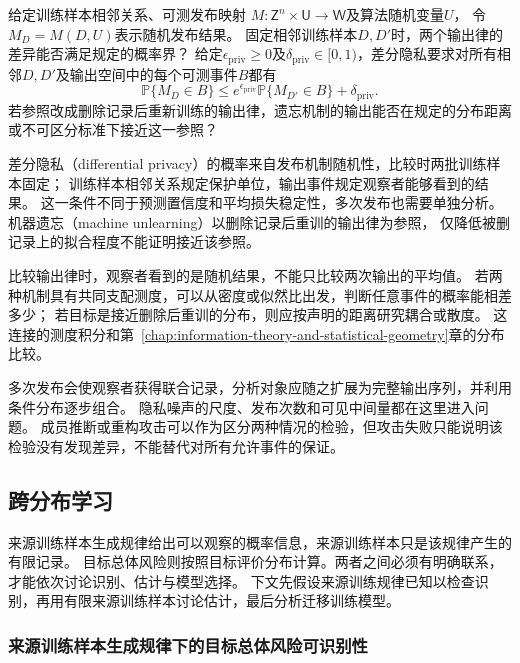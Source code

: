 \begin{mathproblem}[随机输出律的可区分程度]
  \label{question:future-output-law}
  给定训练样本相邻关系、可测发布映射
  $M:\mathsf Z^n\times\mathsf U\to\mathsf W$及算法随机变量$U$，
  令$M_D=M(D,U)$表示随机发布结果。
  固定相邻训练样本$D,D'$时，两个输出律的差异能否满足规定的概率界？
  给定$\epsilon_{\mathrm{priv}}\geq0$及$\delta_{\mathrm{priv}}\in[0,1)$，差分隐私要求对所有相邻$D,D'$及输出空间中的每个可测事件$B$都有
  \[
    \mathbb P\{M_D\in B\}
    \leq e^{\epsilon_{\mathrm{priv}}}
       \mathbb P\{M_{D'}\in B\}+\delta_{\mathrm{priv}}.
  \]
  若参照改成删除记录后重新训练的输出律，遗忘机制的输出能否在规定的分布距离
  或不可区分标准下接近这一参照？
\end{mathproblem}

差分隐私（differential privacy）的概率来自发布机制随机性，比较时两批训练样本固定；
训练样本相邻关系规定保护单位，输出事件规定观察者能够看到的结果。
这一条件不同于预测置信度和平均损失稳定性，多次发布也需要单独分析。
机器遗忘（machine unlearning）以删除记录后重训的输出律为参照，
仅降低被删记录上的拟合程度不能证明接近该参照。

比较输出律时，观察者看到的是随机结果，不能只比较两次输出的平均值。
若两种机制具有共同支配测度，可以从密度或似然比出发，判断任意事件的概率能相差多少；
若目标是接近删除后重训的分布，则应按声明的距离研究耦合或散度。
这连接的测度积分和第~\ref{chap:information-theory-and-statistical-geometry}章的分布比较。

多次发布会使观察者获得联合记录，分析对象应随之扩展为完整输出序列，并利用条件分布逐步组合。
隐私噪声的尺度、发布次数和可见中间量都在这里进入问题。
成员推断或重构攻击可以作为区分两种情况的检验，但攻击失败只能说明该检验没有发现差异，不能替代对所有允许事件的保证。

\subsection{跨分布学习}
\label{sec:future-transfer-theory-map}

来源训练样本生成规律给出可以观察的概率信息，来源训练样本只是该规律产生的有限记录。
目标总体风险则按照目标评价分布计算。两者之间必须有明确联系，才能依次讨论识别、估计与模型选择。
下文先假设来源训练规律已知以检查识别，再用有限来源训练样本讨论估计，最后分析迁移训练模型。

\subsubsection{来源训练样本生成规律下的目标总体风险可识别性}
\label{sec:future-analysis-source-target}

